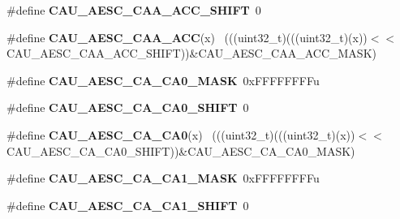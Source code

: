 \begin{DoxyCompactItemize}
\item 
\hypertarget{group___c_a_u___register___masks_ga357ec43ab5d98d835aa90df3c8549123}{}\#define {\bfseries C\+A\+U\+\_\+\+A\+E\+S\+C\+\_\+\+C\+A\+A\+\_\+\+A\+C\+C\+\_\+\+S\+H\+I\+F\+T}~0\label{group___c_a_u___register___masks_ga357ec43ab5d98d835aa90df3c8549123}

\item 
\hypertarget{group___c_a_u___register___masks_ga4e5234a5d68ffb9cccf8979ff84c8ba2}{}\#define {\bfseries C\+A\+U\+\_\+\+A\+E\+S\+C\+\_\+\+C\+A\+A\+\_\+\+A\+C\+C}(x)                                        ~(((uint32\+\_\+t)(((uint32\+\_\+t)(x))$<$$<$C\+A\+U\+\_\+\+A\+E\+S\+C\+\_\+\+C\+A\+A\+\_\+\+A\+C\+C\+\_\+\+S\+H\+I\+F\+T))\&C\+A\+U\+\_\+\+A\+E\+S\+C\+\_\+\+C\+A\+A\+\_\+\+A\+C\+C\+\_\+\+M\+A\+S\+K)\label{group___c_a_u___register___masks_ga4e5234a5d68ffb9cccf8979ff84c8ba2}

\item 
\hypertarget{group___c_a_u___register___masks_ga285f901e854cf3e043f122d717e5403d}{}\#define {\bfseries C\+A\+U\+\_\+\+A\+E\+S\+C\+\_\+\+C\+A\+\_\+\+C\+A0\+\_\+\+M\+A\+S\+K}~0x\+F\+F\+F\+F\+F\+F\+F\+Fu\label{group___c_a_u___register___masks_ga285f901e854cf3e043f122d717e5403d}

\item 
\hypertarget{group___c_a_u___register___masks_gab92e18684282103f4374d6915f54d702}{}\#define {\bfseries C\+A\+U\+\_\+\+A\+E\+S\+C\+\_\+\+C\+A\+\_\+\+C\+A0\+\_\+\+S\+H\+I\+F\+T}~0\label{group___c_a_u___register___masks_gab92e18684282103f4374d6915f54d702}

\item 
\hypertarget{group___c_a_u___register___masks_ga61e6cde868e1ab02c8a8dce52418f9d6}{}\#define {\bfseries C\+A\+U\+\_\+\+A\+E\+S\+C\+\_\+\+C\+A\+\_\+\+C\+A0}(x)                                          ~(((uint32\+\_\+t)(((uint32\+\_\+t)(x))$<$$<$C\+A\+U\+\_\+\+A\+E\+S\+C\+\_\+\+C\+A\+\_\+\+C\+A0\+\_\+\+S\+H\+I\+F\+T))\&C\+A\+U\+\_\+\+A\+E\+S\+C\+\_\+\+C\+A\+\_\+\+C\+A0\+\_\+\+M\+A\+S\+K)\label{group___c_a_u___register___masks_ga61e6cde868e1ab02c8a8dce52418f9d6}

\item 
\hypertarget{group___c_a_u___register___masks_ga9a7a9ba574f5d6189c7e8f0089f64f8c}{}\#define {\bfseries C\+A\+U\+\_\+\+A\+E\+S\+C\+\_\+\+C\+A\+\_\+\+C\+A1\+\_\+\+M\+A\+S\+K}~0x\+F\+F\+F\+F\+F\+F\+F\+Fu\label{group___c_a_u___register___masks_ga9a7a9ba574f5d6189c7e8f0089f64f8c}

\item 
\hypertarget{group___c_a_u___register___masks_ga9b82dd689e9be0ca141d7be86cd16c73}{}\#define {\bfseries C\+A\+U\+\_\+\+A\+E\+S\+C\+\_\+\+C\+A\+\_\+\+C\+A1\+\_\+\+S\+H\+I\+F\+T}~0\label{group___c_a_u___register___masks_ga9b82dd689e9be0ca141d7be86cd16c73}


\end{DoxyCompactItemize}
